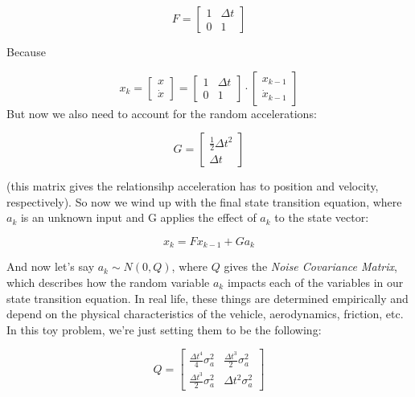 \documentclass[12pt]{article}
\begin{document}
\[
F = \begin{bmatrix}
1 & \Delta t \\
0 & 1
\end{bmatrix}
\]

Because

\[
x_k = 
\begin{bmatrix}
x  \\
\dot{x}
\end{bmatrix}
=
\begin{bmatrix}
1 & \Delta t \\
0 & 1
\end{bmatrix}
\cdot
\begin{bmatrix}
x_{k-1} \\
\dot{x}_{k-1}
\end{bmatrix}
\]
But now we also need to account for the random accelerations:

\[
G = \begin{bmatrix}
\frac{1}{2}\Delta t^2  \\
\Delta t
\end{bmatrix}
\]

(this matrix gives the relationsihp acceleration has to position and velocity, respectively). So now we wind up with the final state transition equation, where \(a_k\) is an unknown input and G applies the effect of \(a_k\) to the state vector:

\[x_k = Fx_{k-1} + Ga_k\]

And now let's say \(a_k \sim N(0, Q)\), where \(Q\) gives the \emph{Noise Covariance Matrix}, which describes how the random variable \(a_k\) impacts each of the variables in our state transition equation. In real life, these things are determined empirically and depend on the physical characteristics of the vehicle, aerodynamics, friction, etc. In this toy problem, we're just setting them to be the following:

\[
Q = \begin{bmatrix}
\frac{\Delta t^4}{4} \sigma_a^2 & \frac{\Delta t^3}{2} \sigma_a^2 \\
\frac{\Delta t^3}{2} \sigma_a^2 & \Delta t^2 \sigma_a^2
\end{bmatrix}
\]
\end{document}

